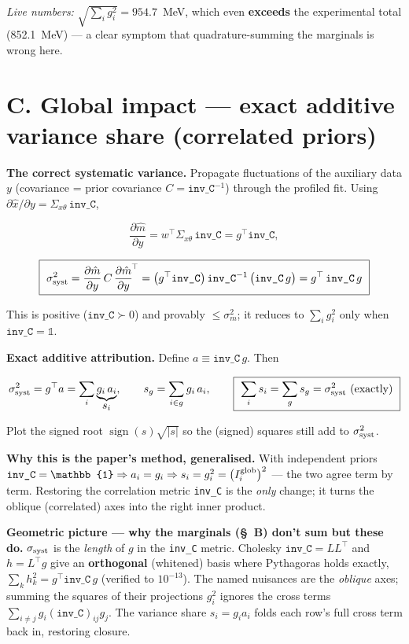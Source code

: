 \documentclass[11pt,a4paper]{article}
\newcommand{\code}[1]{\texttt{#1}}
\begin{document}
\textit{Live numbers:} $\sqrt{\sum_i g_i^2}=954.7$~MeV, which even
\textbf{exceeds} the experimental total (852.1~MeV) --- a clear symptom that
quadrature-summing the marginals is wrong here.

\section*{C. Global impact --- exact additive variance share (correlated priors)}

\textbf{The correct systematic variance.} Propagate fluctuations of the auxiliary
data $y$ (covariance = prior covariance $C=\code{inv\_C}^{-1}$) through the
profiled fit. Using $\partial \hat x/\partial y=\Sigma_{x\theta}\,\code{inv\_C}$,

\[
\frac{\partial\hat m}{\partial y}=w^\top\Sigma_{x\theta}\,\code{inv\_C}=g^\top\code{inv\_C},
\]

\[
\boxed{\ \sigma_{\rm syst}^2=\frac{\partial\hat m}{\partial y}\,C\,\frac{\partial\hat m}{\partial y}^{\!\top}
=\big(g^\top\code{inv\_C}\big)\,\code{inv\_C}^{-1}\,\big(\code{inv\_C}\,g\big)
= g^\top\,\code{inv\_C}\,g\ }
\]

This is positive ($\code{inv\_C}\succ0$) and provably $\le\sigma_m^2$; it reduces
to $\sum_i g_i^2$ only when $\code{inv\_C}=\mathbb{1}$.

\textbf{Exact additive attribution.} Define $a\equiv\code{inv\_C}\,g$. Then

\[
\sigma_{\rm syst}^2=g^\top a=\sum_i \underbrace{g_i\,a_i}_{\textstyle s_i},\qquad
s_g=\sum_{i\in g} g_i\,a_i,\qquad
\boxed{\ \sum_i s_i=\sum_g s_g=\sigma_{\rm syst}^2\ (\text{exactly})\ }
\]

Plot the signed root $\operatorname{sign}(s)\sqrt{|s|}$ so the (signed) squares
still add to $\sigma_{\rm syst}^2$.

\textbf{Why this is the paper's method, generalised.} With independent priors
$\code{inv\_C}=\mathbb{1}\Rightarrow a_i=g_i\Rightarrow s_i=g_i^2=\big(I^{\rm glob}_i\big)^2$
--- the two agree term by term. Restoring the correlation metric \code{inv\_C} is
the \emph{only} change; it turns the oblique (correlated) axes into the right
inner product.

\textbf{Geometric picture --- why the marginals (\S~B) don't sum but these do.}
$\sigma_{\rm syst}$ is the \emph{length} of $g$ in the \code{inv\_C} metric.
Cholesky $\code{inv\_C}=LL^\top$ and $h=L^\top g$ give an \textbf{orthogonal}
(whitened) basis where Pythagoras holds exactly,
$\sum_k h_k^2=g^\top\code{inv\_C}\,g$ (verified to $10^{-13}$). The named
nuisances are the \emph{oblique} axes; summing the squares of their projections
$g_i^2$ ignores the cross terms $\sum_{i\ne j} g_i(\code{inv\_C})_{ij}g_j$. The
variance share $s_i=g_i a_i$ folds each row's full cross term back in, restoring
closure.
\end{document}
